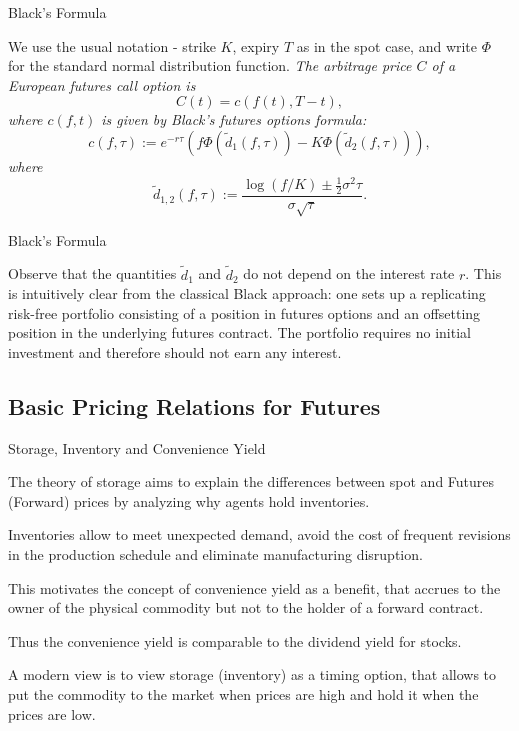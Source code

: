 {%



{Black's Formula}

We use the usual notation -
strike $K$, expiry $T$ as in the spot case, and write $\Phi$ for the
standard normal distribution function.
{\it
The arbitrage price $C$ of a European futures call option is
$$
C(t)= c(f(t), T-t),
$$
where $c(f,t)$ is given by Black's futures options formula:
$$
c(f,\tau) := e^{-r\tau} (f \Phi(\tilde{d}_1 (f,\tau)) - K \Phi(\tilde{d}_2 (f,\tau))),
$$
where
$$
\tilde{d}_{1,2} (f,\tau) := \frac{\log (f/K) \pm \frac{1}{2} {\sigma}^2 \tau}{
\sigma \sqrt{\tau}}.
$$
}

{Black's Formula}

Observe that the quantities $\tilde{d}_1$ and $\tilde{d}_2$ do not depend on the
interest rate $r$. This is intuitively clear from the classical
Black approach: one sets up a replicating risk-free portfolio
consisting of a position in futures options and an offsetting
position in the underlying futures contract. The portfolio
requires no initial investment and therefore should not earn any
interest.

\subsection{Basic Pricing Relations for Futures}

{Storage, Inventory and Convenience Yield}






	The theory of storage aims to explain the differences between spot
and Futures (Forward) prices by analyzing why agents hold inventories.


	Inventories
allow to meet unexpected demand, avoid the cost of frequent revisions in
the production schedule and eliminate manufacturing disruption.


	This
motivates the concept of convenience yield as a benefit, that accrues to the
owner of the physical commodity but not to the holder of a forward contract.


	Thus the convenience yield is comparable to the dividend yield for stocks.


	A modern view is to view storage (inventory) as a timing option, that
allows to put the commodity to the market when prices are high
and hold it when the prices are low.





}
